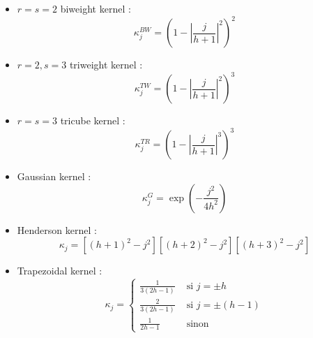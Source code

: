 \documentclass[
  12pt,
  french]{article}
\begin{document}
\begin{multicols}{2}
\begin{itemize}

\item $r=s=2$ biweight kernel :
$$\kappa_j^{BW}=\left(
  1-
  \left\lvert
  \frac j {h+1}
  \right\lvert^2
\right)^2$$

\item $r = 2, s = 3$ triweight kernel :
$$\kappa_j^{TW}=\left(
  1-
  \left\lvert
  \frac j {h+1}
  \right\lvert^2
\right)^3$$

\item $r = s = 3$ tricube kernel :
$$\kappa_j^{TR}=\left(
  1-
  \left\lvert
  \frac j {h+1}
  \right\lvert^3
\right)^3$$

\item Gaussian kernel  :
$$
\kappa_j^G=\exp\left(
-\frac{
  j^2
}{
  4h^2
}\right)
$$
\item Henderson kernel :
$$
\kappa_{j}=\left[(h+1)^{2}-j^{2}\right]\left[(h+2)^{2}-j^{2}\right]\left[(h+3)^{2}-j^{2}\right]
$$

\item Trapezoidal kernel :
$$
\kappa_j=
\begin{cases}
  \frac{1}{3(2h-1)} & \text{ si }j=\pm h 
  \\
  \frac{2}{3(2h-1)} & \text{ si }j=\pm (h-1)\\
  \frac{1}{2h-1}& \text{ sinon}
\end{cases}
$$

\end{itemize}
\end{multicols}
\end{document}
